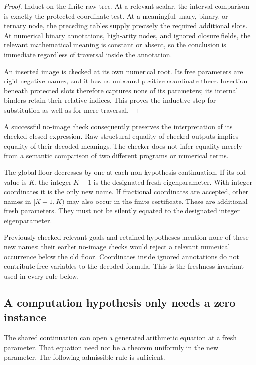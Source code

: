 \documentclass[11pt,letterpaper]{article}
\theoremstyle{definition}
\theoremstyle{remark}
\begin{document}
\begin{proof}
Induct on the finite raw tree.  At a relevant scalar, the interval
comparison is exactly the protected-coordinate test.  At a meaningful
unary, binary, or ternary node, the preceding tables supply precisely
the required additional slots.  At numerical binary annotations,
high-arity nodes, and ignored closure fields, the relevant mathematical
meaning is constant or absent, so the conclusion is immediate
regardless of traversal inside the annotation.

An inserted image is checked at its own numerical root.  Its free
parameters are rigid negative names, and it has no unbound positive
coordinate there.  Insertion beneath protected slots therefore captures
none of its parameters; its internal binders retain their relative
indices.  This proves the inductive step for substitution as well as
for mere traversal.
\end{proof}

A successful no-image check consequently preserves the interpretation
of its checked closed expression.  Raw structural equality of checked
outputs implies equality of their decoded meanings.  The checker does
not infer equality merely from a semantic comparison of two different
programs or numerical terms.

The global floor decreases by one at each non-hypothesis continuation.
If its old value is $K$, the integer $K-1$ is the designated fresh
eigenparameter.  With integer coordinates it is the only new name.
If fractional coordinates are accepted, other names in $[K-1,K)$ may
also occur in the finite certificate.  These are additional fresh
parameters.  They must not be silently equated to the designated
integer eigenparameter.

Previously checked relevant goals and retained hypotheses mention none
of these new names: their earlier no-image checks would reject a
relevant numerical occurrence below the old floor.  Coordinates inside
ignored annotations do not contribute free variables to the decoded
formula.  This is the freshness invariant used in every rule below.

\subsection{A computation hypothesis only needs a zero instance}
\label{subsec:zero-supply}

The shared continuation can open a generated arithmetic equation at a
fresh parameter.  That equation need not be a theorem uniformly in the
new parameter.  The following admissible rule is sufficient.
\end{document}
